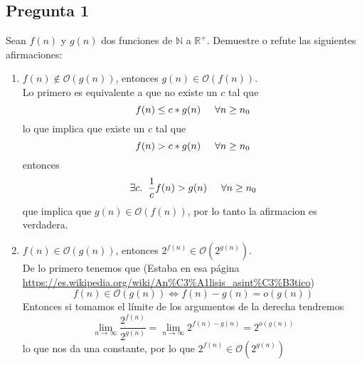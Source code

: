 \documentclass[letter]{article}
\begin{document}
	
	\begin{pregunta}{1} %
		\section*{Pregunta 1}
		Sean $f(n)$ y $g(n)$  dos funciones de $\mathbb{N}$ a $\mathbb{R}^{+}$. Demuestre o refute las siguientes afirmaciones:
		\begin{enumerate}
		\item $f(n) \not \in \mathcal{O}(g(n)) $, entonces $g(n)\in \mathcal{O}(f(n))$.\\
		
		Lo primero es equivalente a que no existe un $c$ tal que 
		$$f(n)\leq c*g(n)\hspace*{5mm} \forall n\geq n_0$$
		lo que implica que existe un $c$ tal que 
		$$f(n) > c*g(n) \hspace*{5mm}\forall n\geq n_0$$
		entonces
		$$\exists c.\hspace*{2mm} \frac{1}{c}f(n) > g(n)\hspace*{5mm} \forall n\geq n_0$$
		que implica que $g(n)\in \mathcal{O}(f(n))$, por lo tanto la afirmacion es verdadera.
		\item $f(n)\in \mathcal{O}(g(n))$, entonces $2^{f(n)}\in \mathcal{O}(2^{g(n)})$.\\
		
		De lo primero tenemos que (Estaba en esa página \url{https://es.wikipedia.org/wiki/An\%C3\%A1lisis_asint\%C3\%B3tico})
		$$f(n)\in \mathcal{O}(g(n))\Leftrightarrow f(n)-g(n) =o(g(n))$$
		Entonces si tomamos el límite de los argumentos de la derecha tendremos
		$$\lim_{n\rightarrow \infty}\frac{2^{f(n)}}{2^{g(n)}}=\lim_{n\rightarrow \infty}2^{f(n)-g(n)}=2^{o(g(n))}$$
		lo que nos da una constante, por lo que $2^{f(n)}\in \mathcal{O}(2^{g(n)})$
		\end{enumerate}
		
	\end{pregunta}
	
\end{document}
